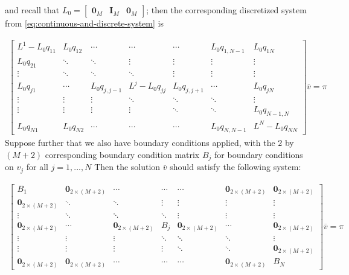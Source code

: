 \documentclass[11pt]{article}
\theoremstyle{definition}
\begin{document}
and recall that $L_0 = \begin{bmatrix} \mathbf{0}_M &  \mathbf{I}_M & \mathbf{0}_M  \end{bmatrix} $; then the corresponding discretized system from \eqref{eq:continuous-and-discrete-system} is

\begin{align}
\begin{bmatrix}
{L}^1 -L_0 q_{11} & L_0 q_{12} & \cdots &  \cdots & \cdots & L_0 q_{1,N-1} & L_0 q_{1N} \\ 
L_0 q_{21} & \ddots & \ddots & \vdots & \vdots & \vdots & \vdots  \\
\vdots & \ddots & \ddots & \ddots  & \vdots & \vdots & \vdots
\\
L_0 q_{j1} &  \cdots & L_0 q_{j,j-1} & {L}^j - L_0 q_{jj} & L_0 q_{j,j+1} & \cdots & L_0 q_{jN} \\
\vdots & \vdots& \vdots &  \ddots & \ddots & \ddots  & \vdots \\ 
\vdots & \vdots  & \vdots& \vdots &  \ddots & \ddots & L_0 q_{N-1,N} \\
L_0 q_{N1} & L_0 q_{N2} & \cdots &  \cdots & \cdots & L_0 q_{N,N-1} & {L}^N - L_0 q_{NN} 
\end{bmatrix}
\overline{v}
=
\pi \label{eq:continuous-and-discrete-system-discrete-larger-states}
\end{align}
Suppose further that we also have boundary conditions applied, with the $2$ by $(M+2)$ corresponding boundary condition matrix $B_j$ for boundary conditions on $v_j$ for all $j = 1,..., N$ Then the solution $\overline{v}$ should satisfy the following system:

\begin{align}
\begin{bmatrix}
B_1 & \mathbf{0}_{2 \times (M+2)} & \cdots &  \cdots & \cdots & \mathbf{0}_{2 \times (M+2)}  & \mathbf{0}_{2 \times (M+2)} \\ 
\mathbf{0}_{2 \times (M+2)} & \ddots & \ddots & \vdots & \vdots & \vdots & \vdots  \\
\vdots & \ddots & \ddots & \ddots  & \vdots & \vdots & \vdots
\\
\mathbf{0}_{2 \times (M+2)} &  \cdots & \mathbf{0}_{2 \times (M+2)} & B_j & \mathbf{0}_{2 \times (M+2)} & \cdots & \mathbf{0}_{2 \times (M+2)} \\
\vdots & \vdots& \vdots &  \ddots & \ddots & \ddots  & \vdots \\ 
\vdots & \vdots  & \vdots& \vdots &  \ddots & \ddots & \mathbf{0}_{2 \times (M+2)} \\
\mathbf{0}_{2 \times (M+2)} & \mathbf{0}_{2 \times (M+2)} & \cdots &  \cdots & \cdots & \mathbf{0}_{2 \times (M+2)} & B_N
\end{bmatrix}
\overline{v}
=
\pi 
\end{align}
\end{document}
